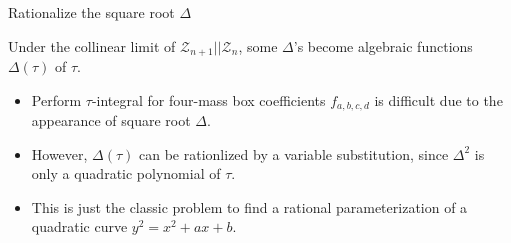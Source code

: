 \documentclass[10pt]{beamer}
\begin{document}
\begin{frame}{Rationalize the square root $\Delta$}

Under the collinear limit of $\mathcal{Z}_{n+1}\vert\vert \mathcal{Z}_{n}$, some $\Delta$'s become algebraic functions $\Delta(\tau)$ of $\tau$.

\begin{itemize}
  \setlength{\itemsep}{20pt}
  \item Perform $\tau$-integral for four-mass box coefficients $f_{a,b,c,d}$ is difficult due to the appearance of square root $\Delta$.
  \item However, $\Delta(\tau)$ can be rationlized by a variable substitution, since $\Delta^{2}$ is only a quadratic polynomial of $\tau$.
  \item 
  This is just the classic problem to find a rational parameterization of a quadratic curve $y^{2}=x^{2}+ax+b$.
\end{itemize}

\end{frame}
\end{document}
